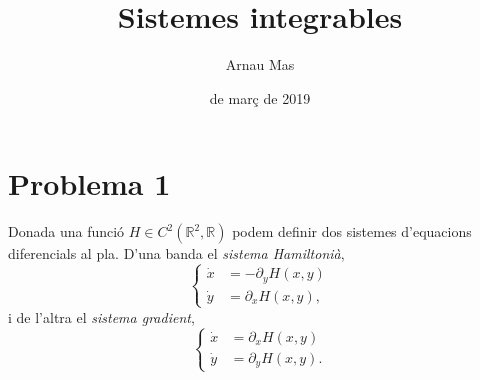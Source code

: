\documentclass[12pt]{article}
\title{\sffamily {\bfseries Seminari 1:} {\sffamily Sistemes integrables}}
\author{\sffamily Arnau Mas}
\date{\sffamily 25 de març de 2019}
\newcommand{\R}{\mathbb{R}}
\begin{document}
\maketitle

\section*{Problema 1}
Donada una funció \( H \in C^2(\R^2, \R) \) podem definir dos sistemes d'equacions diferencials al pla. D'una banda el \emph{sistema Hamiltonià},
\begin{equation*}
	\left\{ 
		\begin{aligned}
			\dot{x} & = -\partial_y H(x,y) \\
			\dot{y} & = \partial_x H(x,y),
		\end{aligned} 
	\right. 
\end{equation*}
i de l'altra el \emph{sistema gradient}, 
\begin{equation*}
	\left\{ 
		\begin{aligned}
			\dot{x} & = \partial_x H(x,y) \\
			\dot{y} & = \partial_y H(x,y).
		\end{aligned} 
	\right. 
\end{equation*}
\end{document}
